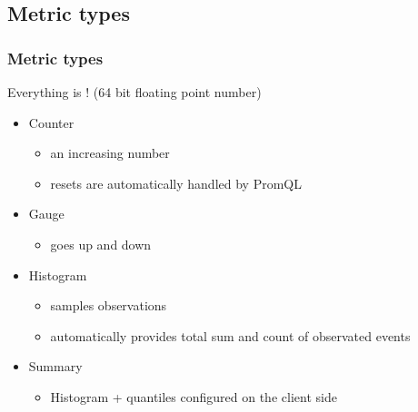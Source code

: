 \subsection{Metric types}
\begin{frame}
  \frametitle{Metric types}

  Everything is  ! {\small(64 bit floating point number)}
  
  \begin{itemize}
   \item Counter 
    \begin{itemize}
     \item an increasing number 
     \item resets are automatically handled by PromQL
    \end{itemize}

   \item Gauge
    \begin{itemize}
     \item goes up and down
    \end{itemize}

   \item Histogram
    \begin{itemize}
     \item samples observations
     \item automatically provides total sum and count of observated events
    \end{itemize}

   \item Summary
    \begin{itemize}
     \item Histogram + quantiles configured on the client side
    \end{itemize}

  \end{itemize}
\end{frame}

